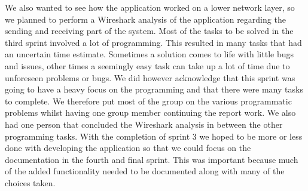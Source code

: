 We also wanted to see how the application worked on a lower network layer, so we planned to perform a Wireshark analysis of the application regarding the sending and receiving part of the system. 
\newline
\newline
Most of the tasks to be solved in the third sprint involved a lot of programming. This resulted in many tasks that had an uncertain time estimate. Sometimes a solution comes to life with little bugs and issues, other times a seemingly easy task can take up a lot of time due to unforeseen problems or bugs. We did however acknowledge that this sprint was going to have a heavy focus on the programming and that there were many tasks to complete. We therefore put most of the group on the various programmatic problems whilst having one group member continuing the report work. We also had one person that concluded the Wireshark analysis in between the other programming tasks. 
\newline
\newline
With the completion of sprint 3 we hoped to be more or less done with developing the application so that we could focus on the documentation in the fourth and final sprint. This was important because much of the added functionality needed to be documented along with many of the choices taken.